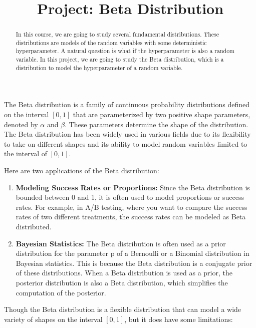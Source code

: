 \documentclass{article}
\title{Project: Beta Distribution}
\author{}
\date{}
\theoremstyle{definition}
\theoremstyle{remark}
\begin{document}
\maketitle
\begin{abstract}
    In this course, we are going to study several fundamental distributions. These distributions are models of the random variables with some deterministic hyperparameter. A natural question is what if the hyperparameter is also a random variable. In this project, we are going to study the Beta distribution, which is a distribution to model the hyperparameter of a random variable.
\end{abstract}

The Beta distribution is a family of continuous probability distributions defined on the interval $[0, 1]$ that are parameterized by two positive shape parameters, denoted by $\alpha$ and $\beta$. These parameters determine the shape of the distribution. The Beta distribution has been widely used in various fields due to its flexibility to take on different shapes and its ability to model random variables limited to the interval of $[0,1]$.

Here are two applications of the Beta distribution:
\begin{enumerate}
    \item \textbf{Modeling Success Rates or Proportions:} Since the Beta distribution is bounded between 0 and 1, it is often used to model proportions or success rates. For example, in A/B testing, where you want to compare the success rates of two different treatments, the success rates can be modeled as Beta distributed.
    \item \textbf{Bayesian Statistics:} The Beta distribution is often used as a prior distribution for the parameter p of a Bernoulli or a Binomial distribution in Bayesian statistics. This is because the Beta distribution is a conjugate prior of these distributions. When a Beta distribution is used as a prior, the posterior distribution is also a Beta distribution, which simplifies the computation of the posterior.
\end{enumerate}

Though the Beta distribution is a flexible distribution that can model a wide variety of shapes on the interval $[0, 1]$, but it does have some limitations:
\end{document}
